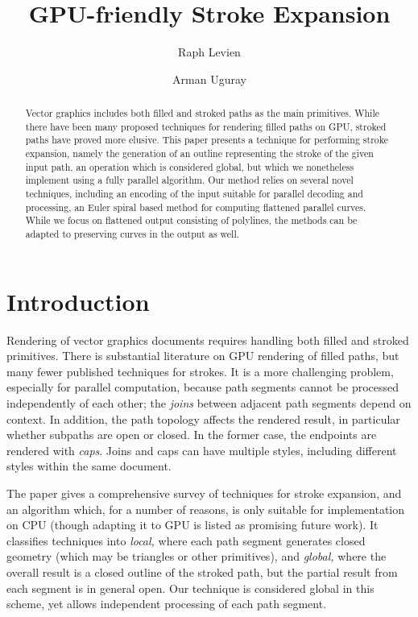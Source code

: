 \documentclass[format=acmsmall]{acmart}
\begin{document}
\title{GPU-friendly Stroke Expansion}
\author{Raph Levien}
\author{Arman Uguray}

\begin{abstract}
    Vector graphics includes both filled and stroked paths as the main primitives. While there have been many proposed techniques for rendering filled paths on GPU, stroked paths have proved more elusive. This paper presents a technique for performing stroke expansion, namely the generation of an outline representing the stroke of the given input path, an operation which is considered global, but which we nonetheless implement using a fully parallel algorithm. Our method relies on several novel techniques, including an encoding of the input suitable for parallel decoding and processing, an Euler spiral based method for computing flattened parallel curves. While we focus on flattened output consisting of polylines, the methods can be adapted to preserving curves in the output as well.
\end{abstract}

\maketitle
\thispagestyle{empty}
\pagestyle{plain}

\section{Introduction}

Rendering of vector graphics documents requires handling both filled and stroked primitives. There is substantial literature on GPU rendering of filled paths, but many fewer published techniques for strokes. It is a more challenging problem, especially for parallel computation, because path segments cannot be processed independently of each other; the \emph{joins} between adjacent path segments depend on context. In addition, the path topology affects the rendered result, in particular whether subpaths are open or closed. In the former case, the endpoints are rendered with \emph{caps}. Joins and caps can have multiple styles, including different styles within the same document.

The \cite{Nehab2020} paper gives a comprehensive survey of techniques for stroke expansion, and an algorithm which, for a number of reasons, is only suitable for implementation on CPU (though adapting it to GPU is listed as promising future work). It classifies techniques into \emph{local,} where each path segment generates closed geometry (which may be triangles or other primitives), and \emph{global,} where the overall result is a closed outline of the stroked path, but the partial result from each segment is in general open. Our technique is considered global in this scheme, yet allows independent processing of each path segment.
\end{document}

